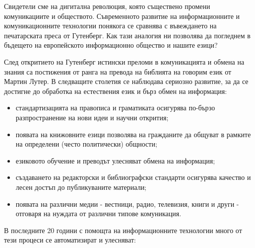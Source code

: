 \documentclass[]{../../metanetpaper}
\begin{document}
\clearpage


\begin{multicols}{2}

Свидетели сме на дигитална революция, която съществено промени комуникациите и обществото. Съвременното развитие на информационните и  комуникационните технологии понякога се сравнява с въвеждането на печатарската преса от Гутенберг. Как тази аналогия ни позволява да погледнем в бъдещето на европейското информационно общество и нашите езици?

След откритието на Гутенберг истински преломи в комуникацията и обмена на знания са постижения от ранга на превода на библията на говорим език от Мартин Лутер. В следващите
 столетия се наблюдава сериозно развитие, за да се достигне до
обработка на естествения език и бърз обмен на информация:

\begin{itemize}
\item стандартизацията на правописа и граматиката осигурява по-бързо разпространение на нови идеи и научни открития;
\item появата на книжовните езици позволява на гражданите да общуват в рамките на определени  (често политически) общности;
\item езиковото обучение и преводът улесняват обмена на информация;
\item  създаването на редакторски и библиографски стандарти осигурява качество и лесен достъп до публикуваните материали;
\item появата на различни медии - вестници, радио, телевизия, книги и други - отговаря на нуждата от различни типове комуникация.
\end{itemize}

В последните 20 години с помощта на информационните технологии много от тези процеси се автоматизират и улесняват:


\end{multicols}
\end{document}

